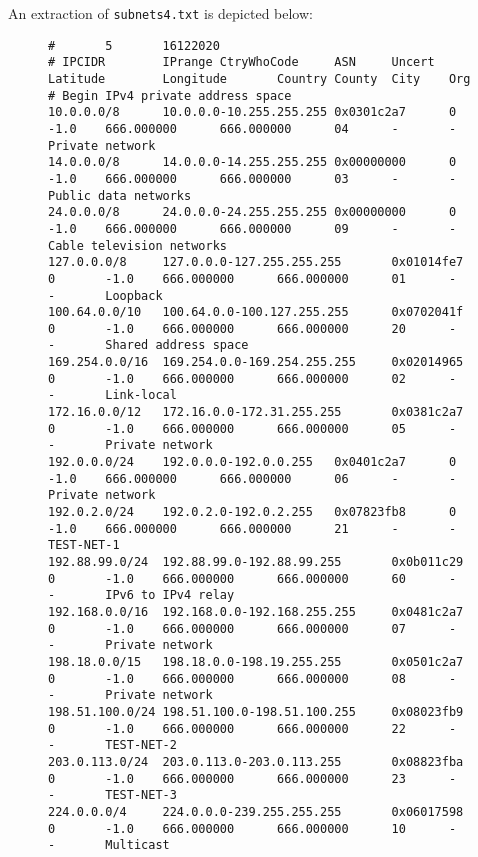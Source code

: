 An extraction of {\tt subnets4.txt} is depicted below:

\begin{figure}[!ht]
\centering
\begin{small}
\begin{lstlisting}
#       5       16122020
# IPCIDR        IPrange CtryWhoCode     ASN     Uncert  Latitude        Longitude       Country County  City    Org
# Begin IPv4 private address space
10.0.0.0/8      10.0.0.0-10.255.255.255 0x0301c2a7      0       -1.0    666.000000      666.000000      04      -       -       Private network
14.0.0.0/8      14.0.0.0-14.255.255.255 0x00000000      0       -1.0    666.000000      666.000000      03      -       -       Public data networks
24.0.0.0/8      24.0.0.0-24.255.255.255 0x00000000      0       -1.0    666.000000      666.000000      09      -       -       Cable television networks
127.0.0.0/8     127.0.0.0-127.255.255.255       0x01014fe7      0       -1.0    666.000000      666.000000      01      -       -       Loopback
100.64.0.0/10   100.64.0.0-100.127.255.255      0x0702041f      0       -1.0    666.000000      666.000000      20      -       -       Shared address space
169.254.0.0/16  169.254.0.0-169.254.255.255     0x02014965      0       -1.0    666.000000      666.000000      02      -       -       Link-local
172.16.0.0/12   172.16.0.0-172.31.255.255       0x0381c2a7      0       -1.0    666.000000      666.000000      05      -       -       Private network
192.0.0.0/24    192.0.0.0-192.0.0.255   0x0401c2a7      0       -1.0    666.000000      666.000000      06      -       -       Private network
192.0.2.0/24    192.0.2.0-192.0.2.255   0x07823fb8      0       -1.0    666.000000      666.000000      21      -       -       TEST-NET-1
192.88.99.0/24  192.88.99.0-192.88.99.255       0x0b011c29      0       -1.0    666.000000      666.000000      60      -       -       IPv6 to IPv4 relay
192.168.0.0/16  192.168.0.0-192.168.255.255     0x0481c2a7      0       -1.0    666.000000      666.000000      07      -       -       Private network
198.18.0.0/15   198.18.0.0-198.19.255.255       0x0501c2a7      0       -1.0    666.000000      666.000000      08      -       -       Private network
198.51.100.0/24 198.51.100.0-198.51.100.255     0x08023fb9      0       -1.0    666.000000      666.000000      22      -       -       TEST-NET-2
203.0.113.0/24  203.0.113.0-203.0.113.255       0x08823fba      0       -1.0    666.000000      666.000000      23      -       -       TEST-NET-3
224.0.0.0/4     224.0.0.0-239.255.255.255       0x06017598      0       -1.0    666.000000      666.000000      10      -       -       Multicast

\end{lstlisting}
\end{small}
\end{figure}
